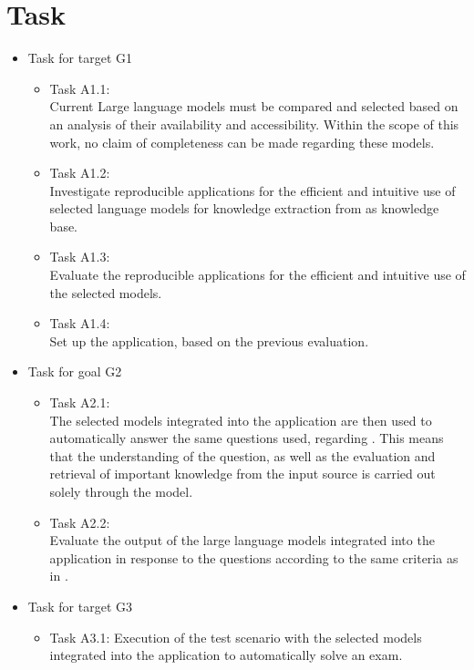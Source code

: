 \section{Task}
\begin{itemize}
  \item Task for target G1
        \begin{itemize}
          \item Task A1.1:\\
          Current Large language models must be compared and selected based on an analysis of their availability and accessibility. 
          Within the scope of this work, no claim of completeness can be made regarding these models.
          \item Task A1.2:\\Investigate reproducible applications for the efficient and intuitive use of selected language models for knowledge extraction from \citet{bb2} as knowledge base.
          \item Task A1.3:\\Evaluate the reproducible applications for the efficient and intuitive use of the selected models. 
          \item Task A1.4:\\Set up the application, based on the previous evaluation. 
        \end{itemize}
  \item Task for goal G2
        \begin{itemize}
        \item Task A2.1:\\
        The selected models integrated into the application are then used to automatically answer the same questions \citet{Paul_Keller} used, regarding \citet{bb2}. 
        This means that the understanding of the question, as well as the evaluation and retrieval of important knowledge from the input source \citet{bb2} is carried out solely through the model.
        \item Task A2.2:\\
        Evaluate the output of the large language models integrated into the application in response to the questions according to the same criteria as in \citet{Paul_Keller}.
        \end{itemize}
 \item Task for target G3
    \begin{itemize}
          \item Task A3.1: Execution of the test scenario with the selected models integrated into the application to automatically solve an exam. 

\end{itemize}
\end{itemize}
